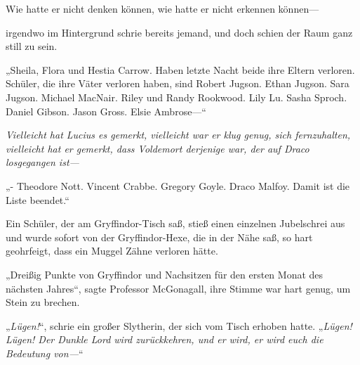 Wie hatte er nicht denken können, wie hatte er nicht erkennen können—

irgendwo im Hintergrund schrie bereits jemand, und doch schien der Raum ganz still zu sein.

„Sheila, Flora und Hestia Carrow. Haben letzte Nacht beide ihre Eltern verloren. Schüler, die ihre Väter verloren haben, sind Robert Jugson. Ethan Jugson. Sara Jugson. Michael MacNair. Riley und Randy Rookwood. Lily Lu. Sasha Sproch. Daniel Gibson. Jason Gross. Elsie Ambrose—“

\emph{Vielleicht hat Lucius es gemerkt, vielleicht war er klug genug, sich fernzuhalten, vielleicht hat er gemerkt, dass Voldemort derjenige war, der auf Draco losgegangen ist—}

„- Theodore Nott. Vincent Crabbe. Gregory Goyle. Draco Malfoy. Damit ist die Liste beendet.“

Ein Schüler, der am Gryffindor-Tisch saß, stieß einen einzelnen Jubelschrei aus und wurde sofort von der Gryffindor-Hexe, die in der Nähe saß, so hart geohrfeigt, dass ein Muggel Zähne verloren hätte.

„Dreißig Punkte von Gryffindor und Nachsitzen für den ersten Monat des nächsten Jahres“, sagte Professor McGonagall, ihre Stimme war hart genug, um Stein zu brechen.

„\emph{Lügen!}“, schrie ein großer Slytherin, der sich vom Tisch erhoben hatte.
„\emph{Lügen! Lügen! Der Dunkle Lord wird zurückkehren, und er wird, er wird euch die Bedeutung von—}“

